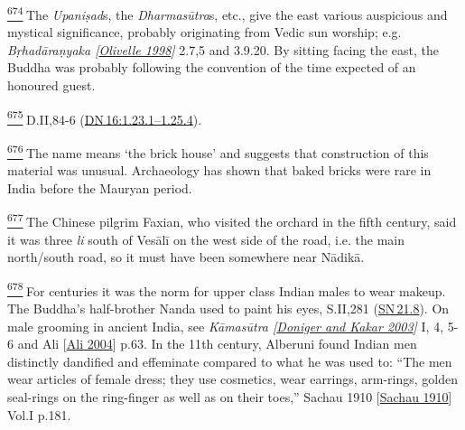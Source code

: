 \label{footprints_split_025.html_fn674}
\hyperref[footprints_split_017.htmlux5cux23fnref674]{\textsuperscript{674}} The
\emph{Upaniṣad}s, the \emph{Dharmasūtra}s, etc., give the east various
auspicious and mystical significance, probably originating from Vedic
sun worship; e.g. \emph{{Bṛhadāraṇyaka
{{[}\hyperref[footprints_split_022.htmlux5cux23Olivelleux5cux25201998]{Olivelle
1998}{]}}}} 2.7,5 and 3.9.20. By sitting facing the east, the Buddha was
probably following the convention of the time expected of an honoured
guest.

\label{footprints_split_025.html_fn675}
\hyperref[footprints_split_017.htmlux5cux23fnref675]{\textsuperscript{675}} D.II,84-6
(\href{https://suttacentral.net/dn16/en/sujato\#1.23.1}{DN\,16:1.23.1--1.25.4}).

\label{footprints_split_025.html_fn676}
\hyperref[footprints_split_017.htmlux5cux23fnref676]{\textsuperscript{676}} The
name means `the brick house' and suggests that construction of this
material was unusual. Archaeology has shown that baked bricks were rare
in India before the Mauryan period.

\label{footprints_split_025.html_fn677}
\hyperref[footprints_split_017.htmlux5cux23fnref677]{\textsuperscript{677}} The
Chinese pilgrim Faxian, who visited the orchard in the fifth century,
said it was three \emph{li} south of Vesālī on the west side of the
road, i.e. the main north/south road, so it must have been somewhere
near Nādikā.

\label{footprints_split_025.html_fn678}
\hyperref[footprints_split_017.htmlux5cux23fnref678]{\textsuperscript{678}} For
centuries it was the norm for upper class Indian males to wear makeup.
The Buddha's half-brother Nanda used to paint his eyes, S.II,281
(\href{https://suttacentral.net/sn21.8/en/sujato}{SN\,21.8}). On male
grooming in ancient India, see \emph{{Kāmasūtra
{{[}\hyperref[footprints_split_023.htmlux5cux23Donigerux5cux2520andux5cux2520Kakarux5cux25202003]{Doniger
and Kakar 2003}{]}}}} I, 4, 5-6 and {Ali
{{[}\hyperref[footprints_split_022.htmlux5cux23Aliux5cux25202004]{Ali
2004}{]}}} p.63. In the 11{th} century, Alberuni found Indian men
distinctly dandified and effeminate compared to what he was used to:
``The men wear articles of female dress; they use cosmetics, wear
earrings, arm-rings, golden seal-rings on the ring-finger as well as on
their toes,'' {Sachau 1910
{{[}\hyperref[footprints_split_023.htmlux5cux23Sachauux5cux25201910]{Sachau
1910}{]}}} Vol.I p.181.

